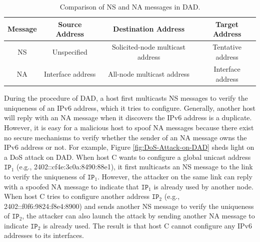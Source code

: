\documentclass[a4paper,fleqn]{cas-dc}
\begin{document}
        \begin{table}
            \centering
            \caption{Comparison of NS and NA messages in DAD.}
            \begin{tabular}{|c||c|c|c|}
                \hline
                \textbf{Message} & \textbf{Source Address} & \textbf{Destination Address} & \textbf{Target Address} \\
                \hline
                \hline
                NS & Unspecified & Solicited-node multicast address & Tentative address \\
                \hline
                NA & Interface address & All-node multicast address & Interface address \\
                \hline
            \end{tabular}
            \label{tab:DAD}
        \end{table}

        During the procedure of DAD, a host first multicasts NS messages to verify the uniqueness of an IPv6 address, which it tries to configure. Generally, another host will reply with an NA message when it discovers the IPv6 address is a duplicate. However, it is easy for a malicious host to spoof NA messages because there exist no secure mechanisms to verify whether the sender of an NA message owns the IPv6 address or not. For example, Figure \ref{fig:DoS-Attack-on-DAD} sheds light on a DoS attack on DAD. When host C wants to configure a global unicast address $\mathtt{IP}_1$ (e.g., 2402::cf4e:3c0a:8490:88e1), it first multicasts an NS message to the link to verify the uniqueness of $\mathtt{IP}_1$. However, the attacker on the same link can reply with a spoofed NA message to indicate that $\mathtt{IP}_1$ is already used by another node. When host C tries to configure another address $\mathtt{IP}_2$ (e.g., 2402::f0f6:9824:f8e4:8900) and sends another NS message to verify the uniqueness of $\mathtt{IP}_2$, the attacker can also launch the attack by sending another NA message to indicate $\mathtt{IP}_2$ is already used. The result is that host C cannot configure any IPv6 addresses to its interfaces.
\end{document}
